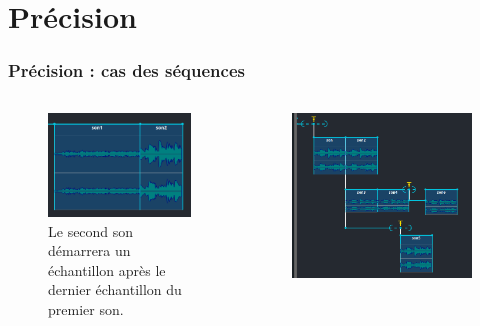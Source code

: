 \documentclass{beamer}
\begin{document}
\section{Précision}
\begin{frame}
	\frametitle{Précision : cas des séquences}
	\Large
	
	\begin{columns}
		\begin{column}{0.5\textwidth}
			\begin{figure}
				\centering
				\includegraphics[width=\textwidth]{images/sequence.png}
				\caption{Le second son démarrera un échantillon après le dernier échantillon du premier son.}
			\end{figure}
		\end{column}
		\begin{column}{0.5\textwidth}
			\begin{figure}
				\centering
				\includegraphics[width=\textwidth]{images/triggers.png}

\end{figure}
\end{column}
\end{columns}
\end{frame}
\end{document}
